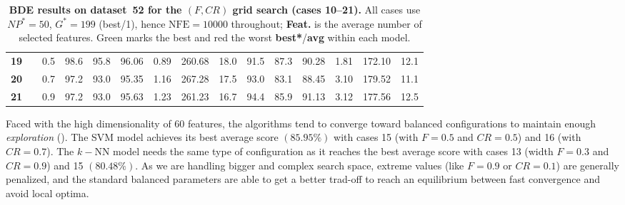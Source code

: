 \documentclass[12pt, openany]{article}
\begin{document}
\begin{table}[H]
{\begin{tabular}{|c c c | c c c c c c | c c c c c c |}
        \textbf{19} &  & 0.5 & \cellcolor{best}98.6 & 95.8 & 96.06 & 0.89 & 260.68 & 18.0 & \cellcolor{worst}91.5 & 87.3 & 90.28 & 1.81 & 172.10 & 12.1 \\
        \textbf{20} &  & 0.7 & \cellcolor{worst}97.2 & 93.0 & \cellcolor{worst}95.35 & 1.16 & 267.28 & 17.5 & 93.0 & 83.1 & \cellcolor{worst}88.45 & 3.10 & 179.52 & 11.1 \\
        \textbf{21} &  & 0.9 & \cellcolor{worst}97.2 & 93.0 & 95.63 & 1.23 & 261.23 & 16.7 & 94.4 & 85.9 & 91.13 & 3.12 & 177.56 & 12.5 \\
        \hline
    \end{tabular}
    }
    \caption{\textbf{BDE results on dataset~52 for the $(F, CR)$ grid search (cases 10--21).} All cases use $NP^{*}{=}50$, $G^{*}{=}199$ (best/1), hence $\mathrm{NFE}=10000$ throughout; \textbf{Feat.} is the average number of selected features. Green marks the best and red the worst \textbf{best*}/\textbf{avg} within each model.}
    \label{tab:results_BDE_FCR_d52}
\end{table}

Faced with the high dimensionality of 60 features, the algorithms tend to converge toward balanced configurations to maintain enough \emph{exploration} (). The SVM model achieves its best average score $(85.95\%)$ with cases 15 (with $F=0.5$ and $CR=0.5$) and 16 (with $CR=0.7$). The $k-$NN model needs the same type of configuration as it reaches the best average score with cases 13 (width $F=0.3$ and $CR=0.9$) and 15 $(80.48\%)$. As we are handling bigger and complex search space, extreme values (like $F=0.9$ or $CR=0.1$) are generally penalized, and the standard balanced parameters are able to get a better trad-off to reach an equilibrium between fast convergence and avoid local optima.
\end{document}
